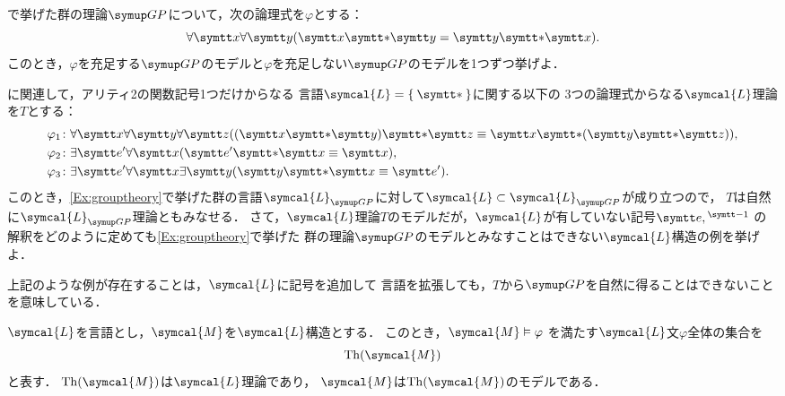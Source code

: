 \begin{Que} \label{Que:model}
	で挙げた群の理論\(\GP\)について，次の論理式を\(\varphi\)とする：
	\[
		\forall \obj{x} \forall \obj{y} \paren{\obj{x} \obj{\ast} \obj{y} = \obj{y} \obj{\ast} \obj{x}}.
	\]
	このとき，\(\varphi\)を充足する\(\GP\)のモデルと\(\varphi\)を充足しない\(\GP\)のモデルを1つずつ挙げよ．
\end{Que}

\begin{Que} \label{Que:grouptheoryaxiomize}
	に関連して，アリティ2の関数記号1つだけからなる
	言語\(\symcal{L} = \Set{\obj{\ast}}\)に関する以下の
	3つの論理式からなる\(\symcal{L}\)理論を\(T\)とする：
	\begin{align*}
		\varphi_1 \colon & \forall \obj{x} \forall \obj{y} \forall \obj{z}
		\paren{\paren{\obj{x} \obj{\ast} \obj{y}} \obj{\ast} \obj{z} \objeq \obj{x} \obj{\ast} \paren{\obj{y} \obj{\ast} \obj{z}}}, \\
		\varphi_2 \colon & \exists \obj{e'} \forall \obj{x} \paren{\obj{e'} \obj{\ast} \obj{x} \objeq \obj{x}},                     \\
		\varphi_3 \colon & \exists \obj{e'}\forall \obj{x} \exists \obj{y} \paren{\obj{y} \obj{\ast} \obj{x} \objeq \obj{e'}}.
	\end{align*}
	このとき，\cref{Ex:grouptheory}で挙げた群の言語\(\symcal{L}_{\GP}\)に対して\(\symcal{L} \subset \symcal{L}_{\GP}\)が成り立つので，
	\(T\)は自然に\(\symcal{L}_{\GP}\)理論ともみなせる．
	さて，\(\symcal{L}\)理論\(T\)のモデルだが，\(\symcal{L}\)が有していない記号\(\obj{e}, {}^{\obj{-1}}\)
	の解釈をどのように定めても\cref{Ex:grouptheory}で挙げた
	群の理論\(\GP\)のモデルとみなすことはできない\(\symcal{L}\)構造の例を挙げよ．

	上記のような例が存在することは，\(\symcal{L}\)に記号を追加して
	言語を拡張しても，\(T\)から\(\GP\)を自然に得ることはできないことを意味している．
\end{Que}

\begin{Def} \label{Def:modeltheory}
	\(\symcal{L}\)を言語とし，\(\symcal{M}\)を\(\symcal{L}\)構造とする．
	このとき，\(\symcal{M} \satisfy \varphi\)
	を満たす\(\symcal{L}\)文\(\varphi\)全体の集合を
	\begin{equation}
		\apply{\Th}{\symcal{M}}
		\label{eq:modeltheory}
	\end{equation}
	と表す．
	\(\apply{\Th}{\symcal{M}}\)は\(\symcal{L}\)理論であり，
	\(\symcal{M}\)は\(\apply{\Th}{\symcal{M}}\)のモデルである．
\end{Def}

